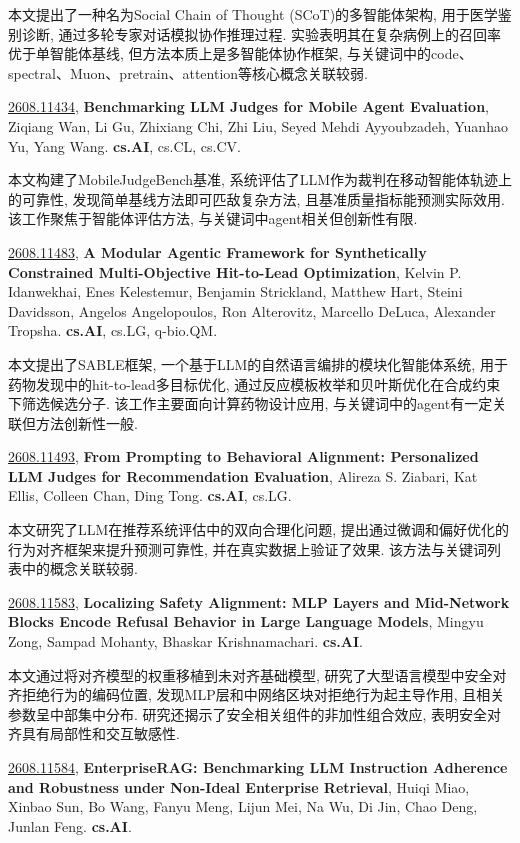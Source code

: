 \documentclass[9pt, a4paper]{article}
\theoremstyle{plain}
\theoremstyle{definition}
\theoremstyle{remark}
\newcommand{\arxivwithtarget}[3]{\hypertarget{#1}{}\href{https://arxiv.org/abs/#1}{#1}, \textbf{\textcolor{arxivblue}{#2}}, #3. }
\begin{document}
本文提出了一种名为Social Chain of Thought (SCoT)的多智能体架构, 用于医学鉴别诊断, 通过多轮专家对话模拟协作推理过程. 实验表明其在复杂病例上的召回率优于单智能体基线, 但方法本质上是多智能体协作框架, 与关键词中的code、spectral、Muon、pretrain、attention等核心概念关联较弱.


\arxivwithtarget{2608.11434}{Benchmarking LLM Judges for Mobile Agent Evaluation}{Ziqiang Wan, Li Gu, Zhixiang Chi, Zhi Liu, Seyed Mehdi Ayyoubzadeh, Yuanhao Yu, Yang Wang}\textbf{cs.AI}, cs.CL, cs.CV.

本文构建了MobileJudgeBench基准, 系统评估了LLM作为裁判在移动智能体轨迹上的可靠性, 发现简单基线方法即可匹敌复杂方法, 且基准质量指标能预测实际效用. 该工作聚焦于智能体评估方法, 与关键词中agent相关但创新性有限.


\arxivwithtarget{2608.11483}{A Modular Agentic Framework for Synthetically Constrained Multi-Objective Hit-to-Lead Optimization}{Kelvin P. Idanwekhai, Enes Kelestemur, Benjamin Strickland, Matthew Hart, Steini Davidsson, Angelos Angelopoulos, Ron Alterovitz, Marcello DeLuca, Alexander Tropsha}\textbf{cs.AI}, cs.LG, q-bio.QM.

本文提出了SABLE框架, 一个基于LLM的自然语言编排的模块化智能体系统, 用于药物发现中的hit-to-lead多目标优化, 通过反应模板枚举和贝叶斯优化在合成约束下筛选候选分子. 该工作主要面向计算药物设计应用, 与关键词中的agent有一定关联但方法创新性一般.


\arxivwithtarget{2608.11493}{From Prompting to Behavioral Alignment: Personalized LLM Judges for Recommendation Evaluation}{Alireza S. Ziabari, Kat Ellis, Colleen Chan, Ding Tong}\textbf{cs.AI}, cs.LG.

本文研究了LLM在推荐系统评估中的双向合理化问题, 提出通过微调和偏好优化的行为对齐框架来提升预测可靠性, 并在真实数据上验证了效果. 该方法与关键词列表中的概念关联较弱.


\arxivwithtarget{2608.11583}{Localizing Safety Alignment: MLP Layers and Mid-Network Blocks Encode Refusal Behavior in Large Language Models}{Mingyu Zong, Sampad Mohanty, Bhaskar Krishnamachari}\textbf{cs.AI}.

本文通过将对齐模型的权重移植到未对齐基础模型, 研究了大型语言模型中安全对齐拒绝行为的编码位置, 发现MLP层和中网络区块对拒绝行为起主导作用, 且相关参数呈中部集中分布. 研究还揭示了安全相关组件的非加性组合效应, 表明安全对齐具有局部性和交互敏感性.


\arxivwithtarget{2608.11584}{EnterpriseRAG: Benchmarking LLM Instruction Adherence and Robustness under Non-Ideal Enterprise Retrieval}{Huiqi Miao, Xinbao Sun, Bo Wang, Fanyu Meng, Lijun Mei, Na Wu, Di Jin, Chao Deng, Junlan Feng}\textbf{cs.AI}.
\end{document}

